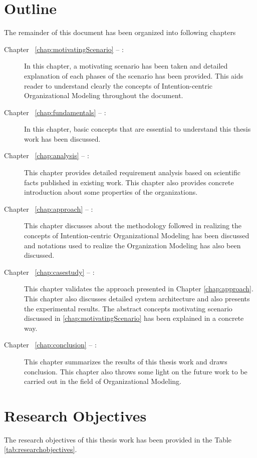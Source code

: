 \section {Outline}
\label{sec:outline}
The remainder of this document has been organized into following chapters
\begin{description}
\item[Chapter ~\ref{chap:motivatingScenario} -- :] In this chapter, a motivating scenario has been taken and detailed explanation of each phases of the scenario has been provided. This aids reader to understand clearly the concepts of  Intention-centric Organizational Modeling throughout the document. 
\item[Chapter ~\ref{chap:fundamentals} -- :] In this chapter, basic concepts that are essential to understand this thesis work has been discussed.
\item[Chapter ~\ref{chap:analysis} -- :] This chapter provides detailed requirement analysis based on scientific facts published in existing work. This chapter also provides concrete introduction about some properties of the organizations.
\item[Chapter ~\ref{chap:approach} -- :] This chapter discusses about the methodology followed in realizing the concepts  of Intention-centric Organizational Modeling has been discussed and notations used to realize the Organization Modeling has also been discussed.
\item[Chapter ~\ref{chap:casestudy} -- :] This chapter validates the approach presented in Chapter \ref{chap:approach}. This chapter also discusses detailed system architecture and also presents the experimental results. The abstract concepts motivating scenario discussed in \ref{chap:motivatingScenario} has been explained in a concrete way.
 
\item[Chapter ~\ref{chap:conclusion} -- :] This chapter summarizes  the results of this thesis work and draws conclusion. This chapter also throws some light on the future work to be carried out in the field of Organizational Modeling. 
\end{description}

\section {Research Objectives}
\label{sec:researchobjectives}
\label{sec:researchobj}
The research objectives of this thesis work has been provided in the Table \ref{tab:researchobjectives}.

